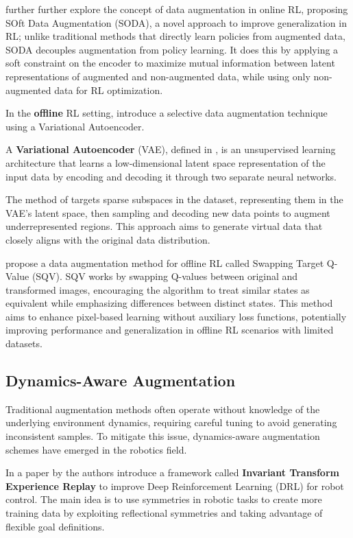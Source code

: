 \cite{hansen2021} further further explore the concept of data augmentation
in online RL, proposing SOft Data Augmentation (SODA),
a novel approach to improve generalization in RL;
unlike traditional methods that directly learn policies
from augmented data, SODA decouples augmentation from policy learning.
It does this by applying a soft constraint on the encoder to
maximize mutual information between latent representations of
augmented and non-augmented data, while using only non-augmented
data for RL optimization.

In the \textbf{offline} RL setting, \cite{han2022}
introduce a selective data augmentation technique
using a Variational Autoencoder.

A \textbf{Variational Autoencoder} (VAE),
defined in \cite{kingma2013},
is an unsupervised learning architecture
that learns a low-dimensional latent space
representation of the input data
by encoding and decoding it through
two separate neural networks.
\label{sec:vae}

The method of \cite{han2022} targets sparse subspaces in the dataset,
representing them in the VAE's latent space,
then sampling and decoding new data points to augment
underrepresented regions. This approach aims to generate
virtual data that closely aligns with the original data distribution.

\cite{joo2022} propose a data augmentation method for offline RL
called Swapping Target Q-Value (SQV).
SQV works by swapping Q-values between original and transformed images,
encouraging the algorithm to treat similar states as equivalent while
emphasizing differences between distinct states.
This method aims to enhance pixel-based learning without auxiliary
loss functions, potentially improving performance and generalization
in offline RL scenarios with limited datasets.

\subsection{Dynamics-Aware Augmentation}

Traditional augmentation methods often operate without
knowledge of the underlying environment dynamics, requiring
careful tuning to avoid generating inconsistent samples.
To mitigate this issue, dynamics-aware augmentation schemes
have emerged in the robotics field.

In a paper by \cite{lin2020} the authors introduce a
framework called
\textbf{Invariant Transform Experience Replay}
to improve Deep Reinforcement Learning (DRL)
for robot control.
The main idea is to use symmetries in robotic
tasks to create more training data by exploiting
reflectional symmetries and taking advantage of
flexible goal definitions.


